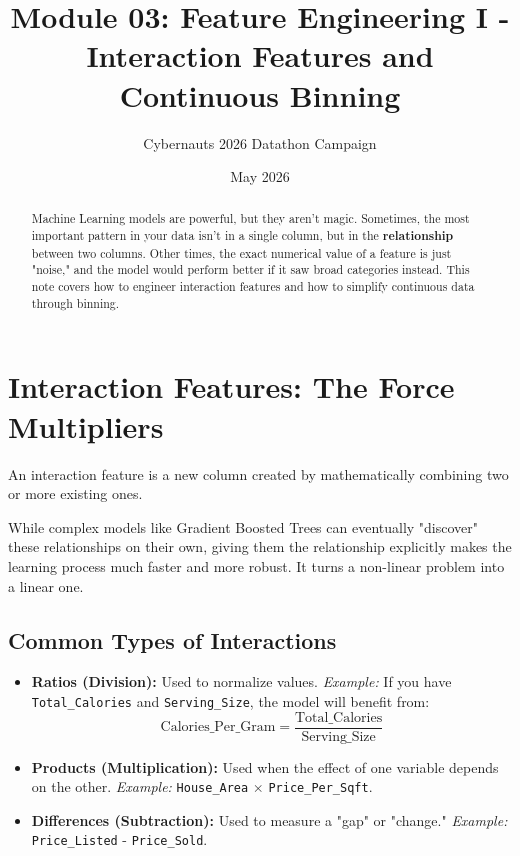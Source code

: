 \documentclass{article}
\title{Module 03: Feature Engineering I - Interaction Features and Continuous Binning}
\author{Cybernauts 2026 Datathon Campaign}
\date{May 2026}
\begin{document}
\maketitle

\begin{abstract}
Machine Learning models are powerful, but they aren't magic. Sometimes, the most important pattern in your data isn't in a single column, but in the \textbf{relationship} between two columns. Other times, the exact numerical value of a feature is just "noise," and the model would perform better if it saw broad categories instead. This note covers how to engineer interaction features and how to simplify continuous data through binning.
\end{abstract}

\tableofcontents
\newpage

\section{Interaction Features: The Force Multipliers}
An interaction feature is a new column created by mathematically combining two or more existing ones. 

\begin{tcolorbox}[colback=blue!5!white,colframe=blue!75!black,title=Why Interactions Matter]
While complex models like Gradient Boosted Trees can eventually "discover" these relationships on their own, giving them the relationship explicitly makes the learning process much faster and more robust. It turns a non-linear problem into a linear one.
\end{tcolorbox}

\subsection{Common Types of Interactions}
\begin{itemize}
    \item \textbf{Ratios (Division):} Used to normalize values.
    \textit{Example:} If you have \texttt{Total\_Calories} and \texttt{Serving\_Size}, the model will benefit from:
    \begin{equation}
        \text{Calories\_Per\_Gram} = \frac{\text{Total\_Calories}}{\text{Serving\_Size}}
    \end{equation}
    \item \textbf{Products (Multiplication):} Used when the effect of one variable depends on the other.
    \textit{Example:} \texttt{House\_Area} $\times$ \texttt{Price\_Per\_Sqft}.
    \item \textbf{Differences (Subtraction):} Used to measure a "gap" or "change."
    \textit{Example:} \texttt{Price\_Listed} - \texttt{Price\_Sold}.
\end{itemize}
\end{document}
